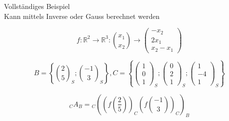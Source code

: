 \begin{KR}{Vollständiges Beispiel} 
    \\Kann mittels Inverse oder Gauss berechnet werden

    $$
    f: \mathbb{R}^{2} \rightarrow \mathbb{R}^{3}:\binom{x_{1}}{x_{2}} \rightarrow\begin{pmatrix} -x_{2} \\ 2 x_{1} \\ x_{2}-x_{1} \end{pmatrix}
    $$

    $$
    B=\left\{\binom{2}{5}_{S} ;\binom{-1}{3}_{S}\right\}, C=\left\{\begin{pmatrix} 1 \\ 0 \\ 1 \end{pmatrix}_{S} ;\begin{pmatrix} 0 \\ 2 \\ 1 \end{pmatrix}_{S} ;\begin{pmatrix} 1 \\ -4 \\ 1 \end{pmatrix}_{S}\right\}
    $$

    $$
    { }_{C} A_{B}={ }_{C}\left(\left(f\left(\frac{2}{5}\right)\right)_{C}\left(f\binom{-1}{3}\right)_{C}\right)_{B}
    $$

    \vspace{2mm}


    \vspace{2mm}


\end{KR}
